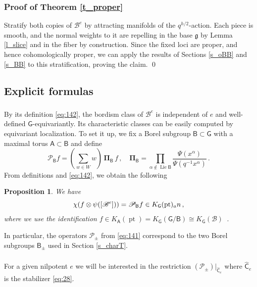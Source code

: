 \documentclass[14pt]{extarticle}
\newcommand{\bA}{\mathsf{A}}
\newcommand{\bG}{\mathsf{G}}
\newcommand{\bCh}{\widehat{\mathsf{C}}}
\newcommand{\bB}{\mathsf{B}}
\newcommand{\cP}{\mathscr{P}}
\newcommand{\cB}{\mathscr{B}}
\newcommand{\bPi}{\boldsymbol{\Pi}}
\newcommand{\fg}{\mathfrak{g}}
\newcommand{\an}{\textup{an}}
\DeclareMathOperator{\Lie}{Lie}
\DeclareMathOperator{\pt}{pt}
\newtheorem{Proposition}[Lemma]{Proposition}
\theoremstyle{definition}
\begin{document}
\subsubsection{Proof of Theorem \ref{t_proper}}

Stratify both copies of $\cB^e$ by attracting manifolds of the
$q^{h/2}$-action. Each piece is smooth, and the normal weights to it
are repelling in the base $\fg$ by Lemma \ref{l_slice} and in the
fiber by construction. Since the fixed loci are proper, and hence
cohomologically proper, we can
apply the results of Sections \ref{s_oBB} and \ref{s_BB} to this
stratification, proving the claim. \qed

\subsection{Explicit formulas}

\subsubsection{} 

By its definition \eqref{eq:142}, the bordism class of $\cB^e$ is independent of $e$
and well-defined $\bG$-equivariantly. Its characteristic classes can
be easily computed by equivariant localization. To set it up, we fix a Borel subgroup $\bB \subset \bG$ with a maximal
torus $\bA \subset \bB$ and define
%
\begin{equation}
  \label{eq:145}
  \cP_\bB f = \left(\sum_{w \in W} w \right)\,
  \bPi_\bB \, f \,, \quad 
  \bPi_\bB = \prod_{\alpha \notin \Lie \bB}
  \frac{\Psi(x^{\alpha})}{\Psi(q^{-1} x^{\alpha})} \,. 
\end{equation}
%
From definitions and \eqref{eq:142}, we obtain the following 

\begin{Proposition}
  We have
  \begin{equation}
    \chi( f \otimes \psi([\cB^e])) = \cP_\bB f \in K_\bG(\pt)_\an\,, 
\label{e_cPbB}
  \end{equation}
  where we use the identification $f\in K_\bA(\pt) = K_\bG(\bG/\bB)
  \cong K_\bG(\cB)$ \,. 
\end{Proposition}

\noindent
In particular, the operators $\cP_\pm$ from \eqref{eq:141} correspond
to the two Borel subgroups $\bB_\pm$ used in Section
\ref{s_charT}. 


\subsubsection{}\label{s_W(e)} 
For a given nilpotent $e$ we will be interested in the restriction
$\left(\cP_\pm \right)|_{\bCh_e}$ where $\bCh_e$ is the
stabilizer \eqref{eq:28}.
\end{document}
